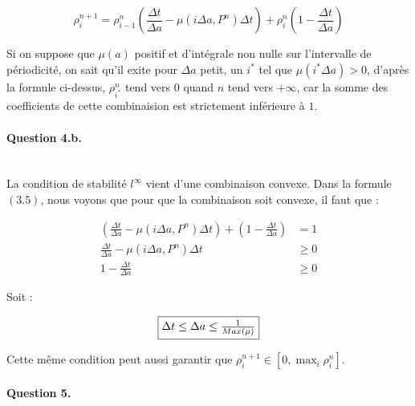\documentclass[paper=a4, french]{scrartcl} %
\numberwithin{equation}{section} %
\numberwithin{figure}{section} %
\numberwithin{table}{section} %
\begin{document}
\begin{equation}
\rho_{i}^{n+1} = \rho_{i-1}^{n} (\frac{\Delta t}{\Delta a} - \mu(i\Delta a, P^n)\Delta t) + \rho_{i}^{n} (1-\frac{\Delta t}{\Delta a})
\end{equation}

Si on suppose que $\mu(a)$ positif et d\rq{}intégrale non nulle sur l\rq{}intervalle de périodicité, on sait qu\rq{}il exite pour $\Delta a$ petit, un $i^*$ tel que $\mu(i^*\Delta a) > 0$, d\rq{}après la formule ci-dessus, $\rho_{i^*}^{n}$ tend vers $0$ quand $n$ tend vers $+\infty$, car la somme des coefficients de cette combinaision est strictement inférieure à $1$.


\paragraph{\textbf{Question 4.b.}}
~\\

La condition de stabilité $l^\infty$ vient d\rq{}une combinaison convexe. Dans la formule $(3.5)$, nous voyons que pour que la combinaison soit convexe, il faut que :

\begin{equation*}
\begin{aligned}
(\frac{\Delta t}{\Delta a} - \mu(i\Delta a, P^n)\Delta t) + (1-\frac{\Delta t}{\Delta a}) & = 1 \\
\frac{\Delta t}{\Delta a} - \mu(i\Delta a, P^n)\Delta t & \geq 0 \\
1-\frac{\Delta t}{\Delta a} & \geq 0 
\end{aligned}
\end{equation*}

Soit :

\begin{equation}
\fbox{$\Delta t \leq \Delta a \leq \frac{1}{Max(\mu)}$}
\end{equation}

Cette même condition peut aussi garantir que $\rho_{i}^{n+1}\in[0,\max_{i}\rho_{i}^{n}]$.


\paragraph{\textbf{Question 5.}}
~\\
\end{document}
